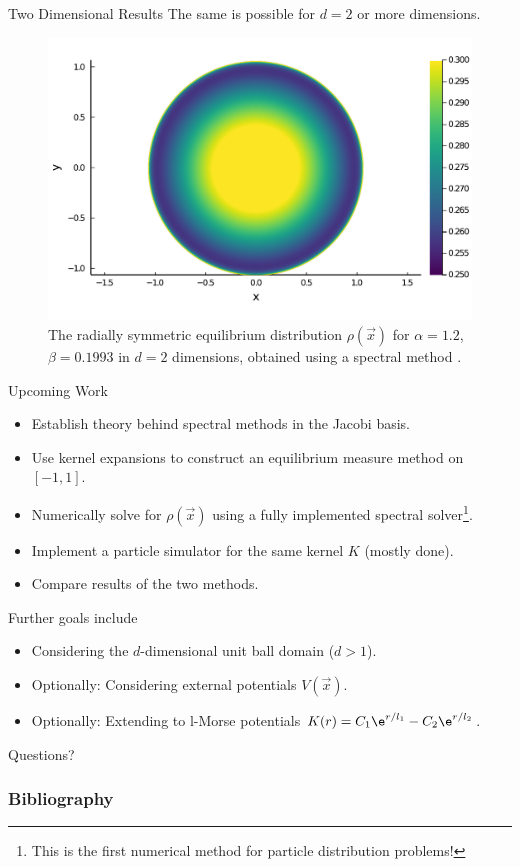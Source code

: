 \documentclass[aspectratio=169, hyperref={colorlinks=true}]{beamer}
\begin{document}
  \begin{frame}{Two Dimensional Results}
    \vspace{0.4cm}
    The same is possible for $d = 2$ or more dimensions.
    \begin{figure}[H]
      \centering
      \includegraphics[width=0.5\linewidth]{figures/spectral-solution-2d.pdf}
      \caption*{The radially symmetric equilibrium distribution $\rho(\vec{x})$ for $\alpha = 1.2$, $\beta = 0.1993$ in $d = 2$ dimensions, obtained using a spectral method \cite{2021-arbitrary-dimensions}.}
    \end{figure}
  \end{frame}

  \begin{frame}{Upcoming Work}
    \begin{itemize}
      \item Establish theory behind spectral methods in the Jacobi basis.
      \item Use kernel expansions to construct an equilibrium measure method on $[-1, 1]$.
      \item Numerically solve for $\rho(\vec{x})$ using a fully implemented spectral solver\footnote{This is the first numerical method for particle distribution problems!}.
      \item Implement a particle simulator for the same kernel $K$ (mostly done).
      \item Compare results of the two methods.
    \end{itemize}
    Further goals include
    \begin{itemize}
      \item Considering the $d$-dimensional unit ball domain ($d > 1$).
      \item Optionally: Considering external potentials $V(\vec{x})$.
      \item Optionally: Extending to l-Morse potentials $K(r) = C_1 \e^{r / l_1} - C_2 \e^{r / l_2}$.
    \end{itemize}
  \end{frame}

  \begin{frame}{}
    Questions?
  \end{frame}

  \begin{frame}[allowframebreaks]
    \frametitle{Bibliography}
    \printbibliography[heading=bibnumbered]
  \end{frame}
\end{document}
